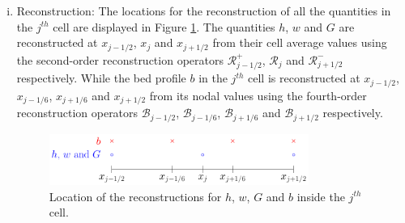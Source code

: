 \begin{enumerate}[(i)]
	\item Reconstruction: The locations for the reconstruction of all the quantities in the $j^{th}$ cell are displayed in Figure \ref{fig:ReconLocs}. The quantities $h$, $w$ and $G$ are reconstructed at $x_{j-1/2}$, $x_{j}$ and $x_{j+1/2}$ from their cell average values using the second-order reconstruction operators $\mathcal{R}^+_{j-1/2}$, $\mathcal{R}_{j}$ and $\mathcal{R}^-_{j+1/2}$ respectively. While the bed profile $b$ in the $j^{th}$ cell is reconstructed at $x_{j-1/2}$, $x_{j-1/6}$, $x_{j+1/6}$ and $x_{j+1/2}$ from its nodal values using the fourth-order reconstruction operators $\mathcal{B}_{j-1/2}$, $\mathcal{B}_{j-1/6}$, $\mathcal{B}_{j+1/6}$ and $\mathcal{B}_{j+1/2}$ respectively. 
	\begin{figure}
		\centering
		\includegraphics[width=0.8\textwidth]{./chp3/figures/FEVMRecon.pdf}
		\caption{Location of the reconstructions for $h$, $w$, $G$ and $b$ inside the $j^{th}$ cell.}
		\label{fig:ReconLocs}
	\end{figure}
	

\end{enumerate}
